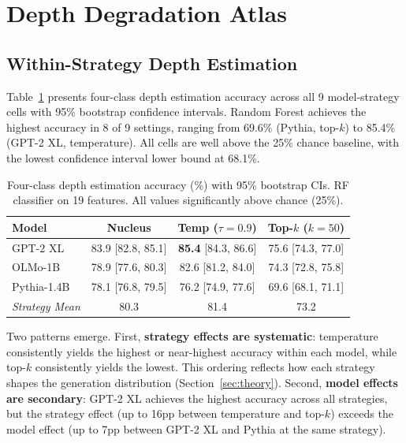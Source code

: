 \documentclass[11pt,a4paper]{article}
\begin{document}
\section{Depth Degradation Atlas}
\label{sec:atlas}

\subsection{Within-Strategy Depth Estimation}

Table~\ref{tab:main_results} presents four-class depth estimation accuracy across all 9 model-strategy cells with 95\% bootstrap confidence intervals. Random Forest achieves the highest accuracy in 8 of 9 settings, ranging from 69.6\% (Pythia, top-$k$) to 85.4\% (GPT-2 XL, temperature). All cells are well above the 25\% chance baseline, with the lowest confidence interval lower bound at 68.1\%.

\begin{table}[t]
\centering
\caption{Four-class depth estimation accuracy (\%) with 95\% bootstrap CIs. RF classifier on 19 features. All values significantly above chance (25\%).}
\label{tab:main_results}
\small
\begin{tabular}{lccc}
\toprule
\textbf{Model} & \textbf{Nucleus} & \textbf{Temp ($\tau{=}0.9$)} & \textbf{Top-$k$ ($k{=}50$)} \\
\midrule
GPT-2 XL & 83.9 {\scriptsize [82.8, 85.1]} & \textbf{85.4} {\scriptsize [84.3, 86.6]} & 75.6 {\scriptsize [74.3, 77.0]} \\
OLMo-1B  & 78.9 {\scriptsize [77.6, 80.3]} & 82.6 {\scriptsize [81.2, 84.0]} & 74.3 {\scriptsize [72.8, 75.8]} \\
Pythia-1.4B & 78.1 {\scriptsize [76.8, 79.5]} & 76.2 {\scriptsize [74.9, 77.6]} & 69.6 {\scriptsize [68.1, 71.1]} \\
\midrule
\textit{Strategy Mean} & 80.3 & 81.4 & 73.2 \\
\bottomrule
\end{tabular}
\end{table}

Two patterns emerge. First, \textbf{strategy effects are systematic}: temperature consistently yields the highest or near-highest accuracy within each model, while top-$k$ consistently yields the lowest. This ordering reflects how each strategy shapes the generation distribution (Section~\ref{sec:theory}). Second, \textbf{model effects are secondary}: GPT-2 XL achieves the highest accuracy across all strategies, but the strategy effect (up to 16pp between temperature and top-$k$) exceeds the model effect (up to 7pp between GPT-2 XL and Pythia at the same strategy).
\end{document}
